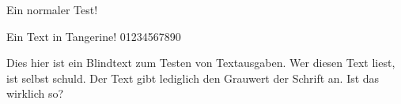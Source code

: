 \documentclass{article}
\begin{document}
\Huge

Ein normaler Test!

{\gftangerine Ein Text in Tangerine! 01234567890

Dies hier ist ein Blindtext zum Testen von Textausgaben.
Wer diesen Text liest, ist selbst schuld. Der Text gibt lediglich
den Grauwert der Schrift an. Ist das wirklich so?
}
\end{document}
